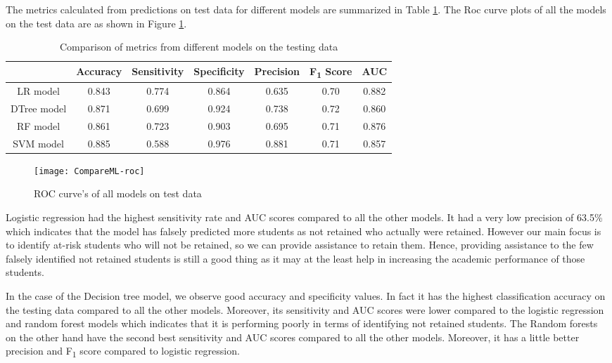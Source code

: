 \documentclass[11pt,openright]{report}
\begin{document}
The metrics calculated from predictions on test data for different models are summarized in Table \ref{table:compare_models_db}. The Roc curve plots of all the models on the test data are as shown in Figure \ref{fig:comparison_roc}.

\begin{table}[!htb]
	\renewcommand{\arraystretch}{1.3}
	\caption{Comparison of metrics from different models on the testing data}
	\label{table:compare_models_db}
	\centering
	\begin{tabular}{|c|c|c|c|c|c|c|}
    \hline
  	 & \bfseries Accuracy & \bfseries Sensitivity & \bfseries Specificity & \bfseries Precision & \bfseries F\textsubscript{1} Score  & \bfseries AUC\\  
    \hline
    	LR model & 0.843 & 0.774 & 0.864 & 0.635 & 0.70 & 0.882 \\ \hline
	DTree model & 0.871 & 0.699 & 0.924 & 0.738 & 0.72 & 0.860 \\ \hline
	RF model & 0.861 & 0.723 & 0.903 & 0.695 & 0.71 & 0.876 \\ \hline
	SVM model & 0.885 & 0.588 & 0.976 & 0.881 & 0.71 & 0.857 \\ \hline
	\end{tabular} 
\end{table}


 \begin{figure}[!htb]
	\centering
	\texttt{[image: CompareML-roc]}
	\caption{ROC curve's of all models on test data}
	\label{fig:comparison_roc}
\end{figure} 

Logistic regression had the highest sensitivity rate and AUC scores compared to all the other models. It had a very low precision of 63.5\% which indicates that the model has falsely predicted more students as not retained who actually were retained. However our main focus is to identify at-risk students who will not be retained, so we can provide assistance to retain them. Hence, providing assistance to the few falsely identified not retained students is still a good thing as it may at the least help in increasing the academic performance of those students. 
 
In the case of the Decision tree model, we observe good accuracy and specificity values. In fact it has the highest classification accuracy on the testing data compared to all the other models. Moreover, its sensitivity and AUC scores were lower compared to the logistic regression and random forest models which indicates that it is performing poorly in terms of identifying not retained students. The Random forests on the other hand have the second best sensitivity and AUC scores compared to all the other models. Moreover, it has a little better precision and F\textsubscript{1} score compared to logistic regression.
\end{document}

